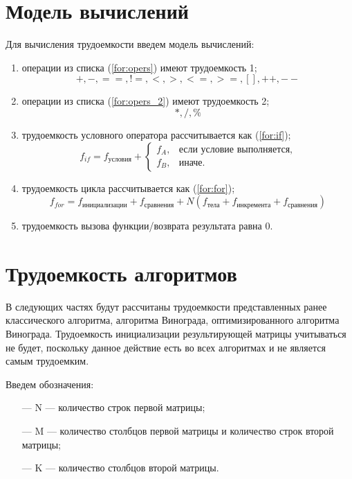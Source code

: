 \clearpage

\section{Модель вычислений}
Для вычисления трудоемкости введем модель вычислений:
\begin{enumerate}
	\item операции из списка (\ref{for:opers}) имеют трудоемкость 1;
	\begin{equation}
		\label{for:opers}
		+, -, ==, !=, <, >, <=, >=, [], ++, {-}-
	\end{equation}
    \item операции из списка (\ref{for:opers_2}) имеют трудоемкость 2;
	\begin{equation}
		\label{for:opers_2}
		*, /, \%
	\end{equation}
	\item трудоемкость условного оператора  рассчитывается как (\ref{for:if});
	\begin{equation}
		\label{for:if}
		f_{if} = f_{\text{условия}} +
		\begin{cases}
			f_A, & \text{если условие выполняется,}\\
			f_B, & \text{иначе.}
		\end{cases}
	\end{equation}
	\item трудоемкость цикла рассчитывается как (\ref{for:for});
	\begin{equation}
		\label{for:for}
		f_{for} = f_{\text{инициализации}} + f_{\text{сравнения}} + N(f_{\text{тела}} + f_{\text{инкремента}} + f_{\text{сравнения}})
	\end{equation}
	\item трудоемкость вызова функции/возврата результата равна 0.
\end{enumerate}


\section{Трудоемкость алгоритмов}
В следующих частях будут рассчитаны трудоемкости представленных ранее классического алгоритма, алгоритма Винограда, оптимизированного алгоритма Винограда.
Трудоемкость инициализации результирующей матрицы учитываться не будет, поскольку данное действие есть во всех алгоритмах и не является самым трудоемким.

Введем обозначения:
\begin{itemize}
	\item[---] N --- количество строк первой матрицы;
	\item[---] M --- количество столбцов первой матрицы и количество строк второй матрицы;
	\item[---] K --- количество столбцов второй матрицы.
\end{itemize}

